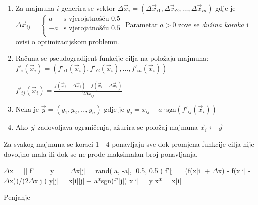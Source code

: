\begin{enumerate}
	\item Za majmuna $i$ generira se vektor $\Delta\vec{x}_i = (\Delta\vec{x}_{i1}, \Delta\vec{x}_{i2}, \dots, \Delta\vec{x}_{in})$  gdje je
	\subitem  $\Delta\vec{x}_{ij} =
	\begin{cases}
		a & \text{s vjerojatnošću } 0.5 \\
		-a & \text{s vjerojatnošću } 0.5 \\
	\end{cases}$
	\subitem Parametar $a > 0$ zove se \textit{dužina koraka} i ovisi o optimizacijskom problemu.
	
	\item Računa se pseudogradijent funkcije cilja na položaju majmuna:
	\subitem $f'_i(\vec{x}_i) = (f'_{i1}(\vec{x}_i), f'_{i2}(\vec{x}_i), \dots, f'_{in}(\vec{x}_i))$ 
	
	\subitem $f'_{ij}(\vec{x}_i) = \frac{f(\vec{x}_i + \Delta\vec{x}_i) - f(\vec{x}_i - \Delta\vec{x}_i)}{2\Delta x_{ij}}$
	
	\item Neka je $\vec{y} = (y_1, y_2, \dots, y_n)$ gdje je
	\subitem $y_j = x_{ij} + a\cdot \text{sgn}(f'_{ij}(\vec{x}_i))$
	
	\item Ako $\vec{y}$ zadovoljava ograničenja, ažurira se položaj majmuna $\vec{x}_i \leftarrow \vec{y}$
\end{enumerate}

Za svakog majmuna se koraci 1 - 4 ponavljaju sve dok promjena funkcije cilja nije dovoljno mala ili dok se ne prođe maksimalan broj ponavljanja.

\begin{algorithm}[H]
	\begin{algorithmic}[1]
		\Repeat
		\State $\Delta$x = []
		\State f' = []
		\State y = []
		\State $\Delta$x[j] = rand([a, -a], [0.5, 0.5])
		\EndFor
		\State f'[j] = (f(x[i] + $\Delta$x) - f(x[i] - $\Delta$x))/(2$\Delta$x[j])
		\EndFor
		\State y[j] = x[i][j] + a*sgn(f'[j])
		\EndFor
		 x[i] = y
		\EndIf
		 x* = x[i]
		\EndIf
		\EndFor
		\EndFunction
	\end{algorithmic}
	\caption{Penjanje}
\end{algorithm}



